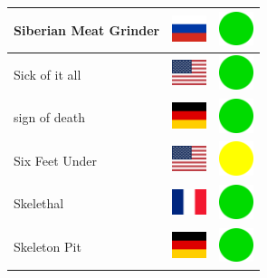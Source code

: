 \documentclass[12pt, a4paper, twoside]{report}
\begin{document}
\begin{center}
\begin{longtable}{|p{5cm}|p{2cm}|p{2cm}|}
Siberian Meat Grinder & \includegraphics[width=1cm]{4x3/ru} & \includegraphics[width=1cm]{likes/y} \\ \hline
Sick of it all & \includegraphics[width=1cm]{4x3/us} & \includegraphics[width=1cm]{likes/y} \\ \hline
sign of death & \includegraphics[width=1cm]{4x3/de} & \includegraphics[width=1cm]{likes/y} \\ \hline
Six Feet Under & \includegraphics[width=1cm]{4x3/us} & \includegraphics[width=1cm]{likes/m} \\ \hline
Skelethal & \includegraphics[width=1cm]{4x3/fr} & \includegraphics[width=1cm]{likes/y} \\ \hline
Skeleton Pit & \includegraphics[width=1cm]{4x3/de} & \includegraphics[width=1cm]{likes/y} \\ \hline

\end{longtable}
\end{center}
\end{document}
